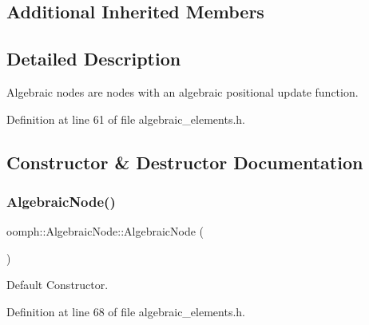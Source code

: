 \subsection*{Additional Inherited Members}


\subsection{Detailed Description}
Algebraic nodes are nodes with an algebraic positional update function. 

Definition at line 61 of file algebraic\+\_\+elements.\+h.



\subsection{Constructor \& Destructor Documentation}
\mbox{\label{classoomph_1_1AlgebraicNode_a7e421172a1063fc49f37559f23837763}} 
\subsubsection{\texorpdfstring{Algebraic\+Node()}{AlgebraicNode()}\hspace{0.1cm}{\footnotesize\ttfamily [1/4]}}
{\footnotesize\ttfamily oomph\+::\+Algebraic\+Node\+::\+Algebraic\+Node (\begin{DoxyParamCaption}{ }\end{DoxyParamCaption})\hspace{0.3cm}{\ttfamily [inline]}}



Default Constructor. 



Definition at line 68 of file algebraic\+\_\+elements.\+h.

\mbox{\label{classoomph_1_1AlgebraicNode_a88eb17187c750f1f1a04d0dd554dd9b5}} 
